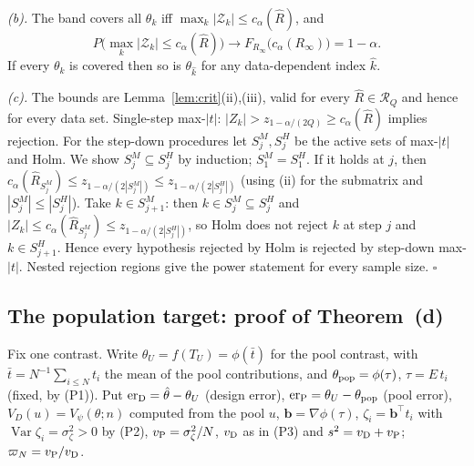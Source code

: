 \emph{(b).} The band covers all $\theta_k$ iff $\max_k|\mathcal Z_k|\le c_\alpha(\hat R)$, and
\[
P\big(\max_k|\mathcal Z_k|\le c_\alpha(\hat R)\big)\to F_{R_\infty}\big(c_\alpha(R_\infty)\big)=1-\alpha.
\]
 If every $\theta_k$ is covered then so is $\theta_{\hat k}$ for any data-dependent index $\hat k$.

\emph{(c).} The bounds are Lemma~\ref{lem:crit}(ii),(iii), valid for every $\hat R\in\mathcal R_Q$ and hence for every data set. Single-step max-$|t|$: $|Z_k|>z_{1-\alpha/(2Q)}\ge c_\alpha(\hat R)$ implies rejection. For the step-down procedures let $S^M_j,S^H_j$ be the active sets of max-$|t|$ and Holm. We show $S^M_j\subseteq S^H_j$ by induction; $S_1^M=S_1^H$. If it holds at $j$, then $c_\alpha(\hat R_{S^M_j})\le z_{1-\alpha/(2|S^M_j|)}\le z_{1-\alpha/(2|S^H_j|)}$ (using (ii) for the submatrix and $|S^M_j|\le|S^H_j|$). Take $k\in S^M_{j+1}$: then $k\in S^M_j\subseteq S^H_j$ and $|Z_k|\le c_\alpha(\hat R_{S^M_j})\le z_{1-\alpha/(2|S^H_j|)}$, so Holm does not reject $k$ at step $j$ and $k\in S^H_{j+1}$. Hence every hypothesis rejected by Holm is rejected by step-down max-$|t|$. Nested rejection regions give the power statement for every sample size. $\square$

\subsection{The population target: proof of Theorem~(d)}\label{si:testing-pop}

Fix one contrast. Write $\theta_U=f(T_U)=\phi(\bar t)$ for the pool contrast, with $\bar t=N^{-1}\sum_{i\le N}t_i$ the mean of the pool contributions, and $\theta_{\rm pop}=\phi(\tau)$, $\tau=E\,t_i$ (fixed, by (P1)). Put $\mathrm{er}_{\rm D}=\hat\theta-\theta_U$ (design error), $\mathrm{er}_{\rm P}=\theta_U-\theta_{\rm pop}$ (pool error), $V_D(u)=V_\psi(\theta;n)$ computed from the pool $u$, $\mathbf b=\nabla\phi(\tau)$, $\zeta_i=\mathbf b^\top t_i$ with $\operatorname{Var}\zeta_i=\sigma_\zeta^2>0$ by (P2), $v_{\rm P}=\sigma^2_\zeta/N$, $v_{\rm D}$ as in (P3) and $s^2=v_{\rm D}+v_{\rm P}$; $\varpi_N=v_{\rm P}/v_{\rm D}$.

